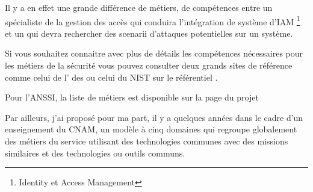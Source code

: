 Il y a en effet une grande différence de métiers, de compétences entre un spécialiste de la gestion des accès  qui conduira l'intégration de système d'IAM  \footnote{Identity et Access Management} et un  qui devra rechercher des scenarii d'attaques potentielles sur un système. 






Si vous souhaitez connaitre avec plus de détails les compétences nécessaires pour les métiers de la sécurité vous pouvez consulter deux grands sites de référence comme celui de l' des 
  ou celui du NIST sur le référentiel  .
 
 Pour l'ANSSI, la liste de métiers est disponible sur la page du projet 
 
Par ailleurs,  j'ai proposé pour ma part, il y a quelques années dans le cadre d'un enseignement du CNAM, un modèle à cinq domaines qui regroupe globalement des métiers du service utilisant des technologies communes avec des  missions similaires et des technologies ou outils communs.
 

